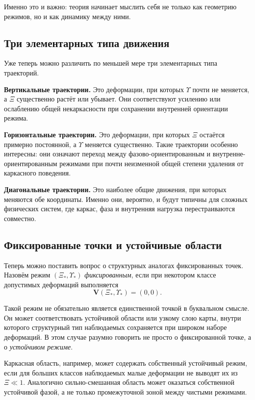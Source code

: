 \documentclass[12pt,a4paper]{article}
\begin{document}
Именно это и важно: теория начинает мыслить себя не только как геометрию режимов, но и как динамику между ними.

\subsection{Три элементарных типа движения}

Уже теперь можно различить по меньшей мере три элементарных типа траекторий.

\textbf{Вертикальные траектории.} Это деформации, при которых \(\Upsilon\) почти не меняется, а \(\Xi\) существенно растёт или убывает. Они соответствуют усилению или ослаблению общей некаркасности при сохранении внутренней ориентации режима.

\textbf{Горизонтальные траектории.} Это деформации, при которых \(\Xi\) остаётся примерно постоянной, а \(\Upsilon\) меняется существенно. Такие траектории особенно интересны: они означают переход между фазово-ориентированным и внутренне-ориентированным режимами при почти неизменной общей степени удаления от каркасного поведения.

\textbf{Диагональные траектории.} Это наиболее общие движения, при которых меняются обе координаты. Именно они, вероятно, и будут типичны для сложных физических систем, где каркас, фаза и внутренняя нагрузка перестраиваются совместно.

\subsection{Фиксированные точки и устойчивые области}

Теперь можно поставить вопрос о структурных аналогах фиксированных точек. Назовём режим \((\Xi_*,\Upsilon_*)\) \textit{фиксированным}, если при некотором классе допустимых деформаций выполняется
\begin{equation}
\mathbf{V}(\Xi_*,\Upsilon_*) = (0,0).
\end{equation}

Такой режим не обязательно является единственной точкой в буквальном смысле. Он может соответствовать устойчивой области или узкому слою карты, внутри которого структурный тип наблюдаемых сохраняется при широком наборе деформаций. В этом случае разумно говорить не просто о фиксированной точке, а о \textit{устойчивом режиме}.

Каркасная область, например, может содержать собственный устойчивый режим, если для больших классов наблюдаемых малые деформации не выводят их из \(\Xi \ll 1\). Аналогично сильно-смешанная область может оказаться собственной устойчивой фазой, а не только промежуточной зоной между чистыми режимами.
\end{document}
